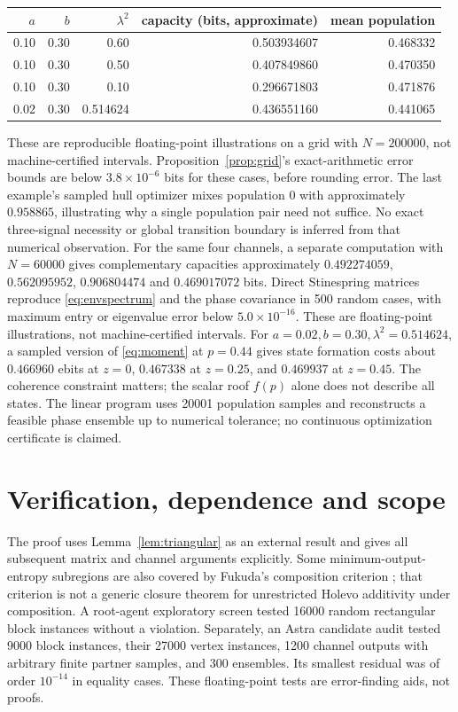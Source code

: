 \documentclass[11pt]{article}
\begin{document}
\begin{center}
\begin{tabular}{rrrrr}
\toprule
$a$&$b$&$\lambda^2$&capacity (bits, approximate)&mean population\\
\midrule
0.10&0.30&0.60&0.503934607&0.468332\\
0.10&0.30&0.50&0.407849860&0.470350\\
0.10&0.30&0.10&0.296671803&0.471876\\
0.02&0.30&0.514624&0.436551160&0.441065\\
\bottomrule
\end{tabular}
\end{center}
These are reproducible floating-point illustrations on a grid with $N=200000$, not machine-certified intervals. Proposition~\ref{prop:grid}'s exact-arithmetic error bounds are below $3.8\times10^{-6}$ bits for these cases, before rounding error. The last example's sampled hull optimizer mixes population $0$ with approximately $0.958865$, illustrating why a single population pair need not suffice. No exact three-signal necessity or global transition boundary is inferred from that numerical observation. For the same four channels, a separate computation with $N=60000$ gives complementary capacities approximately $0.492274059$, $0.562095952$, $0.906804474$ and $0.469017072$ bits. Direct Stinespring matrices reproduce \eqref{eq:envspectrum} and the phase covariance in 500 random cases, with maximum entry or eigenvalue error below $5.0\times10^{-16}$. These are floating-point illustrations, not machine-certified intervals. For $a=0.02,b=0.30,\lambda^2=0.514624$, a sampled version of \eqref{eq:moment} at $p=0.44$ gives state formation costs about $0.466960$ ebits at $z=0$, $0.467338$ at $z=0.25$, and $0.469937$ at $z=0.45$. The coherence constraint matters; the scalar roof $f(p)$ alone does not describe all states. The linear program uses 20001 population samples and reconstructs a feasible phase ensemble up to numerical tolerance; no continuous optimization certificate is claimed.

\section{Verification, dependence and scope}\label{sec:verification}
The proof uses Lemma~\ref{lem:triangular} as an external result and gives all subsequent matrix and channel arguments explicitly. Some minimum-output-entropy subregions are also covered by Fukuda's composition criterion \cite{fukuda}; that criterion is not a generic closure theorem for unrestricted Holevo additivity under composition. A root-agent exploratory screen tested 16000 random rectangular block instances without a violation. Separately, an Astra candidate audit tested 9000 block instances, their 27000 vertex instances, 1200 channel outputs with arbitrary finite partner samples, and 300 ensembles. Its smallest residual was of order $10^{-14}$ in equality cases. These floating-point tests are error-finding aids, not proofs.
\end{document}
